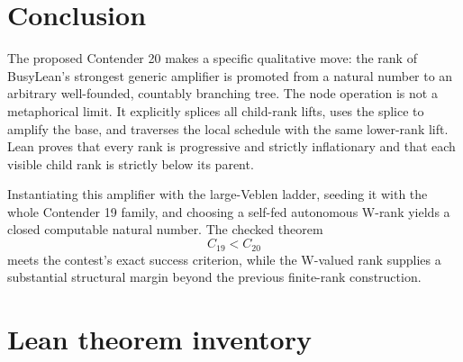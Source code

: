 \documentclass[11pt]{article}
\theoremstyle{definition}
\newcommand{\Cnineteen}{C_{19}}
\newcommand{\Ctwenty}{C_{20}}
\begin{document}
\section{Conclusion}

The proposed Contender 20 makes a specific qualitative move: the rank of
BusyLean's strongest generic amplifier is promoted from a natural number to an
arbitrary well-founded, countably branching tree.  The node operation is not a
metaphorical limit.  It explicitly splices all child-rank lifts, uses the
splice to amplify the base, and traverses the local schedule with the same
lower-rank lift.  Lean proves that every rank is progressive and strictly
inflationary and that each visible child rank is strictly below its parent.

Instantiating this amplifier with the large-Veblen ladder, seeding it with the
whole Contender 19 family, and choosing a self-fed autonomous W-rank yields a
closed computable natural number.  The checked theorem
\[
  \boxed{\Cnineteen<\Ctwenty}
\]
meets the contest's exact success criterion, while the W-valued rank supplies a
substantial structural margin beyond the previous finite-rank construction.

\appendix

\section{Lean theorem inventory}
\end{document}
